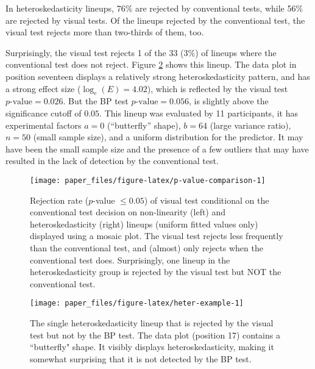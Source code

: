 \documentclass[]{interact}
\theoremstyle{plain}%
\theoremstyle{definition}
\theoremstyle{remark}
\begin{document}
In heteroskedasticity lineups, 76\% are rejected by conventional tests,
while 56\% are rejected by visual tests. Of the lineups rejected by the
conventional test, the visual test rejects more than two-thirds of them,
too.

Surprisingly, the visual test rejects 1 of the 33 (3\%) of lineups where
the conventional test does not reject. Figure \ref{fig:heter-example}
shows this lineup. The data plot in position seventeen displays a
relatively strong heteroskedasticity pattern, and has a strong effect
size (\(\log_e(E)=4.02\)), which is reflected by the visual test
\(p\text{-value} = 0.026\). But the BP test \(p\text{-value} = 0.056\),
is slightly above the significance cutoff of \(0.05\). This lineup was
evaluated by 11 participants, it has experimental factors \(a = 0\)
(``butterfly'' shape), \(b = 64\) (large variance ratio), \(n = 50\)
(small sample size), and a uniform distribution for the predictor. It
may have been the small sample size and the presence of a few outliers
that may have resulted in the lack of detection by the conventional
test.

\begin{figure}

{\centering \texttt{[image: paper\_files/figure-latex/p-value-comparison-1]} 

}

\caption{Rejection rate ($p$-value $\leq0.05$) of visual test conditional on the conventional test decision on non-linearity (left) and heteroskedasticity (right) lineups (uniform fitted values only) displayed using a mosaic plot. The visual test rejects less frequently than the conventional test, and (almost) only rejects when the conventional test does. Surprisingly, one lineup in the heteroskedasticity group is rejected by the visual test but NOT the conventional test.}\label{fig:p-value-comparison}
\end{figure}

\begin{figure}[t!]

{\centering \texttt{[image: paper\_files/figure-latex/heter-example-1]} 

}

\caption{The single heteroskedasticity lineup that is rejected by the visual test but not by the BP test. The data plot (position 17) contains a ``butterfly" shape. It visibly displays heteroskedasticity, making it somewhat surprising that it is not detected by the BP test.}\label{fig:heter-example}
\end{figure}
\end{document}
